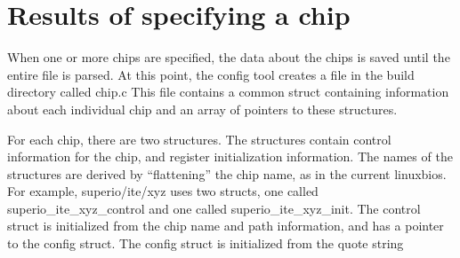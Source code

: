 \section{Results of specifying a chip}

When one or more chips are specified, the data about the chips
is saved until the entire file is parsed. At this point, the config tool
creates a file in the build directory called chip.c This file contains
a common struct containing information about 
each individual chip and an array of pointers to these structures. 

For each chip, there are two structures. The structures contain control 
information for the chip, and register initialization information. The 
names of the structures are derived by ``flattening'' the chip name, 
as in the current linuxbios. For example, superio/ite/xyz uses 
two structs, one called superio_ite_xyz_control and one called
superio_ite_xyz_init. The control struct is initialized from the 
chip name and path information, and has a pointer to the 
config struct. The config struct is initialized from the quote string

